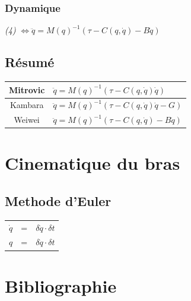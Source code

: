 \documentclass[pdftex,a4paper,11pt]{article}
\begin{document}
\subsubsection{Dynamique}
\emph{(4)} $\Leftrightarrow \ddot{q} = M(q)^{-1} (\tau - C(q, \dot{q}) - B\dot{q}) $

\subsection{Résumé}
\begin{tabular}{|c|l|}
    \hline
    Mitrovic & $\ddot{q} = M(q)^{-1} (\tau - C(q, \dot{q}) \dot{q})$ \\
    \hline
    Kambara  & $\ddot{q} = M(q)^{-1} (\tau - C(q, \dot{q}) \dot{q} - G)$ \\
    \hline
    Weiwei   & $\ddot{q} = M(q)^{-1} (\tau - C(q, \dot{q}) - B\dot{q})$ \\
    \hline
\end{tabular}


\section{Cinematique du bras}

\subsection{Methode d'Euler}

\begin{tabular}{lcl}
    $\dot{q}$ & = & $\delta \ddot{q} \cdot \delta t$ \\
    $q$ & = & $\delta \dot{q} \cdot \delta t$ \\
\end{tabular}
    

\section{Bibliographie}




\end{document}
